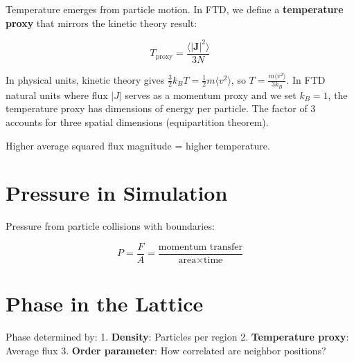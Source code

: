 \documentclass[
  11pt,
  letterpaper,
  twoside,
  openright]{book}
\begin{document}
Temperature emerges from particle motion. In FTD, we define a
\textbf{temperature proxy} that mirrors the kinetic theory result:

\[
T_{\text{proxy}} = \frac{\langle|\mathbf{J}|^2\rangle}{3N}
\]

\begin{tcolorbox}[enhanced jigsaw, coltitle=black, colbacktitle=quarto-callout-note-color!10!white, toprule=.15mm, colframe=quarto-callout-note-color-frame, arc=.35mm, opacityback=0, bottomtitle=1mm, toptitle=1mm, breakable, colback=white, titlerule=0mm, opacitybacktitle=0.6, title=\textcolor{quarto-callout-note-color}{\faInfo}\hspace{0.5em}{Dimensional Analysis}, rightrule=.15mm, bottomrule=.15mm, leftrule=.75mm, left=2mm]

In physical units, kinetic theory gives
\(\frac{3}{2}k_B T = \frac{1}{2}m\langle v^2\rangle\), so
\(T = \frac{m\langle v^2\rangle}{3k_B}\). In FTD natural units where
flux \(|J|\) serves as a momentum proxy and we set \(k_B = 1\), the
temperature proxy has dimensions of energy per particle. The factor of 3
accounts for three spatial dimensions (equipartition theorem).

\end{tcolorbox}

Higher average squared flux magnitude = higher temperature.

\section{Pressure in Simulation}\label{pressure-in-simulation}

Pressure from particle collisions with boundaries:

\[
P = \frac{F}{A} = \frac{\text{momentum transfer}}{\text{area} \times \text{time}}
\]

\section{Phase in the Lattice}\label{phase-in-the-lattice}

Phase determined by: 1. \textbf{Density}: Particles per region 2.
\textbf{Temperature proxy}: Average \textbar flux\textbar{} 3.
\textbf{Order parameter}: How correlated are neighbor positions?
\end{document}
